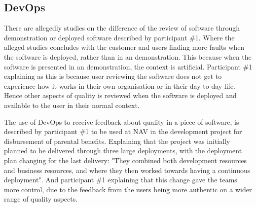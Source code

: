 \subsection{DevOps}
There are allegedly studies on the difference of the review of software through demonstration or deployed software described by participant \#1. Where the alleged studies concludes with the customer and users finding more faults when the software is deployed, rather than in an demonstration. This because when the software is presented in an demonstration, the context is artificial. Participant \#1 explaining as this is because user reviewing the software does not get to experience how it works in their own organisation or in their day to day life. Hence other aspects of quality is reviewed when the software is deployed and available to the user in their normal context.


The use of DevOps to receive feedback about quality in a piece of software, is described by participant \#1 to be used at NAV in the development project for disbursement of parental benefits. Explaining that the project was initially planned to be delivered through three large deployments, with the deployment plan changing for the last delivery: "They combined both development resources and business resources, and where they then worked towards having a continuous deployment". And participant \#1 explaining that this change gave the teams more control, due to the feedback from the users being more authentic on a wider range of quality aspects. 


